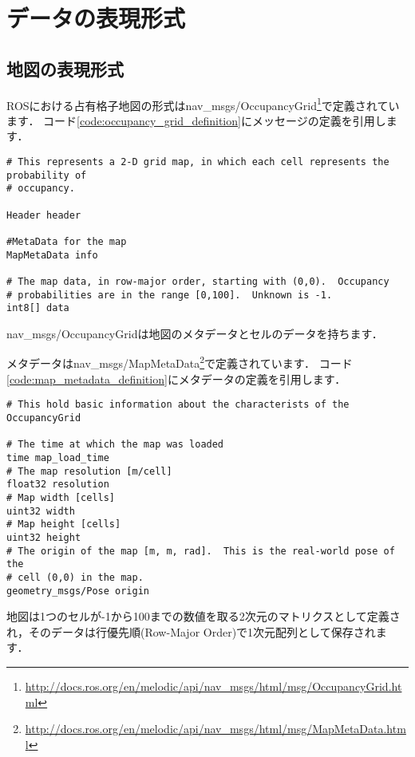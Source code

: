 \documentclass[{../../master}]{subfiles}
\begin{document}
\section{データの表現形式}
\label{sec:data_representation}

\subsection{地図の表現形式}

ROSにおける占有格子地図の形式は\textsf{nav\_msgs/OccupancyGrid}\footnote{\url{http://docs.ros.org/en/melodic/api/nav_msgs/html/msg/OccupancyGrid.html}}で定義されています．
コード\ref{code:occupancy_grid_definition}にメッセージの定義を引用します．

\begin{lstlisting}[label=code:occupancy_grid_definition, caption=Message Difinition of \textsf{nav\_msgs/OccupancyGrid}]
# This represents a 2-D grid map, in which each cell represents the probability of
# occupancy.

Header header 

#MetaData for the map
MapMetaData info

# The map data, in row-major order, starting with (0,0).  Occupancy
# probabilities are in the range [0,100].  Unknown is -1.
int8[] data
\end{lstlisting}

\textsf{nav\_msgs/OccupancyGrid}は地図のメタデータとセルのデータを持ちます．

メタデータは\textsf{nav\_msgs/MapMetaData}\footnote{\url{http://docs.ros.org/en/melodic/api/nav_msgs/html/msg/MapMetaData.html}}で定義されています．
コード\ref{code:map_metadata_definition}にメタデータの定義を引用します．

\begin{lstlisting}[label=code:map_metadata_definition, caption=Message Definition of \textsf{nav\_msgs/MapMetaData}]
# This hold basic information about the characterists of the OccupancyGrid

# The time at which the map was loaded
time map_load_time
# The map resolution [m/cell]
float32 resolution
# Map width [cells]
uint32 width
# Map height [cells]
uint32 height
# The origin of the map [m, m, rad].  This is the real-world pose of the
# cell (0,0) in the map.
geometry_msgs/Pose origin
\end{lstlisting}

地図は1つのセルが-1から100までの数値を取る2次元のマトリクスとして定義され，そのデータは行優先順(Row-Major Order)で1次元配列として保存されます．
\end{document}
